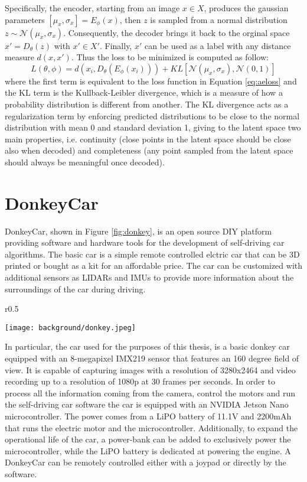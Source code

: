 Specifically, the encoder, starting from an image $x\in X$, produces the gaussian parameters ${[\mu_x, \sigma_x]=E_{\phi }(x)}$, then $z$ is sampled from a normal distribution $z \sim \mathcal{N}(\mu_x, \sigma_x)$. Consequently, the decoder brings it back to the orginal space ${x'=D_{\theta }(z)}$ with $x'\in X'$. Finally, $x'$ can be used as a label with any distance measure $d(x,x')$. Thus the loss to be minimized is computed as follow:
\begin{equation}
\label{eq:vaeloss}
  L(\theta ,\phi) = d(x_{i},D_{\theta }(E_{\phi }(x_{i}))) + KL[\mathcal{N} (\mu_x, \sigma_x),\mathcal{N}(0, 1)]
\end{equation}
where the first term is equivalent to the loss function in Equation \ref{eq:aeloss} and the KL term is the Kullback-Leibler divergence, which is a measure of how a probability distribution is different from another. The KL divergence acts as a regularization term by enforcing predicted distributions to be close to the normal distribution with mean 0 and standard deviation 1, giving to the latent space two main properties, i.e. continuity (close points in the latent space should be close also when decoded) and completeness (any point sampled from the latent space should always be meaningful once decoded). 

\section{DonkeyCar} \label{sec:donkeycar}
DonkeyCar, shown in Figure \ref{fig:donkey}, is an open source DIY platform providing software and hardware tools for the development of self-driving car algorithms. The basic car is a simple remote controlled elctric car that can be 3D printed or bought as a kit for an affordable price. The car can be customized with additional sensors as LIDARs and IMUs to provide more information about the surroundings of the car during driving.

\begin{wrapfigure}[19]{r}{0.5\textwidth}
  \begin{center}
    \texttt{[image: background/donkey.jpeg]}
  \end{center}
  \caption{Assembled donkeycar}
  \label{fig:donkey}
\end{wrapfigure}

In particular, the car used for the purposes of this thesis, is a basic donkey car equipped with an 8-megapixel IMX219 sensor that features an 160 degree field of view. It is capable of capturing images with a resolution of 3280x2464 and video recording up to a resolution of 1080p at 30 frames per seconds. In order to process all the information coming from the camera, control the motors and run the self-driving car software the car is equipped with an NVIDIA Jetson Nano microcontroller. The power comes from a LiPO battery of 11.1V and 2200mAh that runs the electric motor and the microcontroller. Additionally, to expand the operational life of the car, a power-bank can be added to exclusively power the microcontroller, while the LiPO battery is dedicated at powering the engine. 
A DonkeyCar can be remotely controlled either with a joypad or directly by the software.